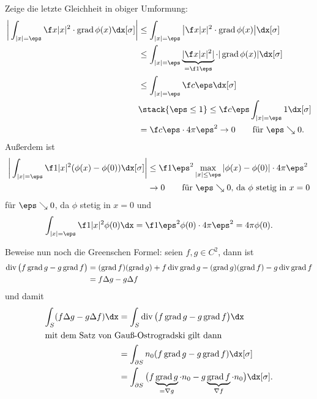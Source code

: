 \begin{ex}
\begin{enumerate}[1)]
			Zeige die letzte Gleichheit in obiger Umformung:
			\begin{align*}
				\bigg| \int_{|x|=\eps} \f x{|x|^2} \cdot \grad \phi(x) \dx[\sigma] \bigg|
				&\le \int_{|x|= \eps} \big| \f x{|x|^2} \cdot \grad \phi(x) \big| \dx[\sigma] \\
				&\le \int_{|x|= \eps} \underbrace{|\f x{|x|^2}|}_{= \f 1\eps} \cdot |\grad \phi(x)| \dx[\sigma] \\
				&\le \int_{|x|=\eps} \f c \eps \dx[\sigma]\\
				&\stack{\eps \le 1}\le \f c\eps \int_{|x|=\eps} 1 \dx[\sigma] \\
				&= \f c\eps \cdot 4 \pi \eps^2
				\to 0 \qquad \text{für $\eps \searrow 0$.}
			\end{align*}
			Außerdem ist
			\begin{align*}
				\bigg| \int_{|x| = \eps} \f 1{|x|^2} (\phi(x) - \phi(0)) \dx[\sigma] \bigg|
				&\le \f 1{\eps^2} \max_{|x|\le \eps} |\phi(x) - \phi(0)| \cdot 4\pi \eps^2 \\
				&\to 0 \qquad \text{für $\eps \searrow 0$, da $\phi$ stetig in $x = 0$}
			\end{align*}
			für $\eps \searrow 0$, da $\phi$ stetig in $x=0$ und
			\[
				\int_{|x|=\eps} \f 1{|x|^2} \phi(0) \dx
				= \f 1{\eps^2} \phi(0) \cdot 4\pi \eps^2
				= 4 \pi \phi(0).
			\]

			Beweise nun noch die Greenschen Formel:
			seien $f, g \in C^2$, dann ist
			\begin{align*}
				\operatorname{div} \big( f \operatorname{grad} g - g \operatorname{grad} f \big)
				&= (\operatorname{grad} f)(\operatorname{grad} g) + f \operatorname{div} \operatorname{grad} g
					-(\operatorname{grad} g)(\operatorname{grad} f) - g \operatorname{div} \operatorname{grad} f \\
				&= f \Delta g - g \Delta f
			\end{align*}
			und damit
			\begin{align*}
				\int_{S} (f \Delta g - g \Delta f) \dx
				&= \int_{S} \div \big( f \grad g - g \grad f\big) \dx \\
			\intertext{mit dem Satz von Gauß-Ostrogradski gilt dann}
				&= \int_{\partial S} n_0 (f \grad g - g \grad f) \dx[\sigma] \\
				&= \int_{\partial S} \big( f\underbrace{\grad g}_{=\nabla g} \cdot n_0 - g \underbrace{\grad f}_{\nabla f} \cdot n_0  \big) \dx[\sigma].
			\end{align*}
	\end{enumerate}
\end{ex}

